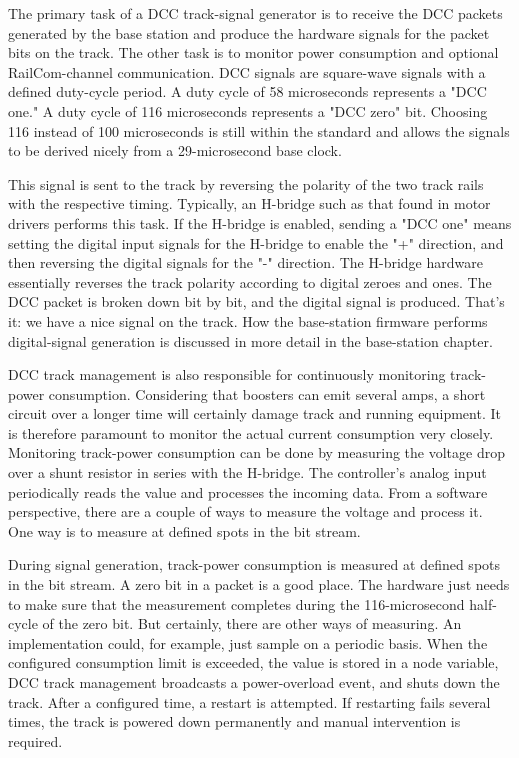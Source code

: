 
The primary task of a DCC track-signal generator is to receive the DCC packets generated by the base station and produce the hardware signals for the packet bits on the track. The other task is to monitor power consumption and optional RailCom-channel communication. DCC signals are square-wave signals with a defined duty-cycle period. A duty cycle of 58 microseconds represents a "DCC one." A duty cycle of 116 microseconds represents a "DCC zero" bit. Choosing 116 instead of 100 microseconds is still within the standard and allows the signals to be derived nicely from a 29-microsecond base clock.

This signal is sent to the track by reversing the polarity of the two track rails with the respective timing. Typically, an H-bridge such as that found in motor drivers performs this task. If the H-bridge is enabled, sending a "DCC one" means setting the digital input signals for the H-bridge to enable the "+" direction, and then reversing the digital signals for the "-" direction. The H-bridge hardware essentially reverses the track polarity according to digital zeroes and ones. The DCC packet is broken down bit by bit, and the digital signal is produced. That's it: we have a nice signal on the track. How the base-station firmware performs digital-signal generation is discussed in more detail in the base-station chapter.


DCC track management is also responsible for continuously monitoring track-power consumption. Considering that boosters can emit several amps, a short circuit over a longer time will certainly damage track and running equipment. It is therefore paramount to monitor the actual current consumption very closely. Monitoring track-power consumption can be done by measuring the voltage drop over a shunt resistor in series with the H-bridge. The controller's analog input periodically reads the value and processes the incoming data. From a software perspective, there are a couple of ways to measure the voltage and process it. One way is to measure at defined spots in the bit stream.

During signal generation, track-power consumption is measured at defined spots in the bit stream. A zero bit in a packet is a good place. The hardware just needs to make sure that the measurement completes during the 116-microsecond half-cycle of the zero bit. But certainly, there are other ways of measuring. An implementation could, for example, just sample on a periodic basis. When the configured consumption limit is exceeded, the value is stored in a node variable, DCC track management broadcasts a power-overload event, and shuts down the track. After a configured time, a restart is attempted. If restarting fails several times, the track is powered down permanently and manual intervention is required.

